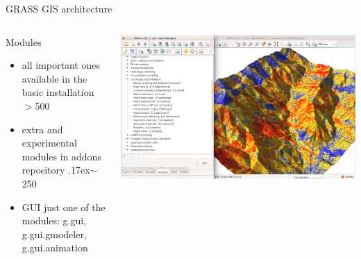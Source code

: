 \documentclass[xcolor={dvipsnames,usenames},beamer,aspectratio=169]{beamer}
\begin{document}
\begin{frame}{GRASS GIS architecture}

\begin{columns}
\begin{column}{0.4\textwidth}

\begin{block}{Modules}
 \begin{itemize}
  \item all important ones available in the basic installation $>$500
  \item extra and experimental modules in addons repository {\raise.17ex\hbox{$\scriptstyle\sim$}}250
  \item GUI just one of the modules: g.gui, g.gui.gmodeler, g.gui.animation
\end{itemize}



\end{block}

\end{column}
\begin{column}{0.45\textwidth}

\begin{center}
  \includegraphics[width=\textwidth]{grass/count_and_modules}
\end{center}

\end{column}
\end{columns}

\end{frame}
\end{document}

